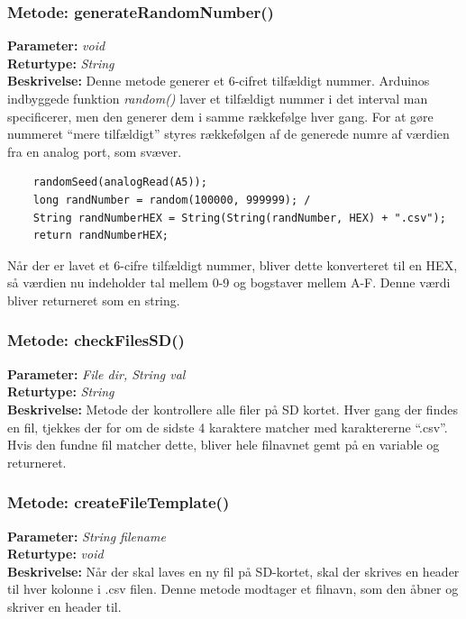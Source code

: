 \subsubsection{Metode: generateRandomNumber()}
\textbf{Parameter: } \textit{void}
\\ \textbf{Returtype: } \textit{String}
\\ \textbf{Beskrivelse: }  Denne metode generer et 6-cifret tilfældigt nummer. Arduinos indbyggede funktion \textit{random()} laver et tilfældigt nummer i det interval man specificerer, men den generer dem i samme rækkefølge hver gang. For at gøre nummeret “mere tilfældigt” styres rækkefølgen af de generede numre af værdien fra en analog port, som svæver. 
\begin{lstlisting}
	randomSeed(analogRead(A5)); 
	long randNumber = random(100000, 999999); /
	String randNumberHEX = String(String(randNumber, HEX) +	".csv");
	return randNumberHEX; 
\end{lstlisting}
Når der er lavet et 6-cifre tilfældigt nummer, bliver dette konverteret til en HEX, så værdien nu indeholder tal mellem 0-9 og bogstaver mellem A-F. Denne værdi bliver returneret som en string. 

\subsubsection{Metode: checkFilesSD()}
\textbf{Parameter: } \textit{File dir, String val}
\\ \textbf{Returtype: } \textit{String}
\\ \textbf{Beskrivelse: }  Metode der kontrollere alle filer på SD kortet. Hver gang der findes en fil, tjekkes der for om de sidste 4 karaktere matcher med karaktererne “.csv”. Hvis den fundne fil matcher dette, bliver hele filnavnet gemt på en variable og returneret. 


\subsubsection{Metode: createFileTemplate()}
\textbf{Parameter: } \textit{String filename}
\\ \textbf{Returtype: } \textit{void}
\\ \textbf{Beskrivelse: }  Når der skal laves en ny fil på SD-kortet, skal der skrives en header til hver kolonne i .csv filen. Denne metode modtager et filnavn, som den åbner og skriver en header til. 

